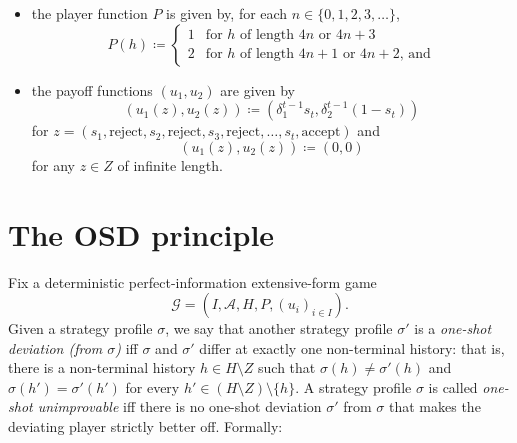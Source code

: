 \begin{example}
\begin{itemize}
		\item the player function $P$ is given by, for each $n \in \{0,1,2,3,\dots\}$, 
		\begin{equation*}
			P(h)
			\coloneqq
			\begin{cases}
				1 & \text{for $h$ of length $4n$ or $4n+3$} \\
				2 & \text{for $h$ of length $4n+1$ or $4n+2$, and}
			\end{cases} 
		\end{equation*}

		\item the payoff functions $(u_1,u_2)$ are given by
		\begin{equation*}
			(u_1(z),u_2(z)) \coloneqq \left( \delta_1^{t-1} s_t, \delta_2^{t-1} (1-s_t) \right)
		\end{equation*}
		for $z = (s_1,\text{reject},s_2,\text{reject},s_3,\text{reject},\dots,s_t,\text{accept})$ and
		\begin{equation*}
			(u_1(z),u_2(z)) \coloneqq (0,0)
		\end{equation*}
		for any $z \in Z$ of infinite length.
	
	\end{itemize}
\end{example}



\section{The OSD principle}
\label{osdp:principle}

Fix a deterministic perfect-information extensive-form game
%
\begin{equation*}
	\mathcal{G}
	= (I,\mathcal{A},H,P,(u_i)_{i \in I}) .
\end{equation*}
%
Given a strategy profile $\sigma$, we say that another strategy profile $\sigma'$ is a \emph{one-shot deviation (from $\sigma$)} iff $\sigma$ and $\sigma'$ differ at exactly one non-terminal history: that is, there is a non-terminal history $h \in H \setminus Z$ such that $\sigma(h) \neq \sigma'(h)$ and $\sigma(h') = \sigma'(h')$ for every $h' \in (H \setminus Z) \setminus \{h\}$. A strategy profile $\sigma$ is called \emph{one-shot unimprovable} iff there is no one-shot deviation $\sigma'$ from $\sigma$ that makes the deviating player strictly better off. Formally:

